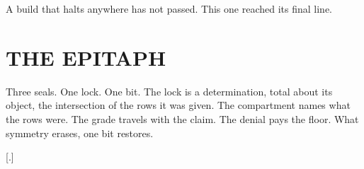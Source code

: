 \documentclass[10pt,twocolumn]{article}
\begin{document}
A build that halts anywhere has not passed. This one reached its final
line.

\hypertarget{the-epitaph}{%
\section{THE EPITAPH}\label{the-epitaph}}

Three seals. One lock. One bit. The lock is a determination, total about
its object, the intersection of the rows it was given. The compartment
names what the rows were. The grade travels with the claim. The denial
pays the floor. What symmetry erases, one bit restores.

{[}.{]}
\end{document}
